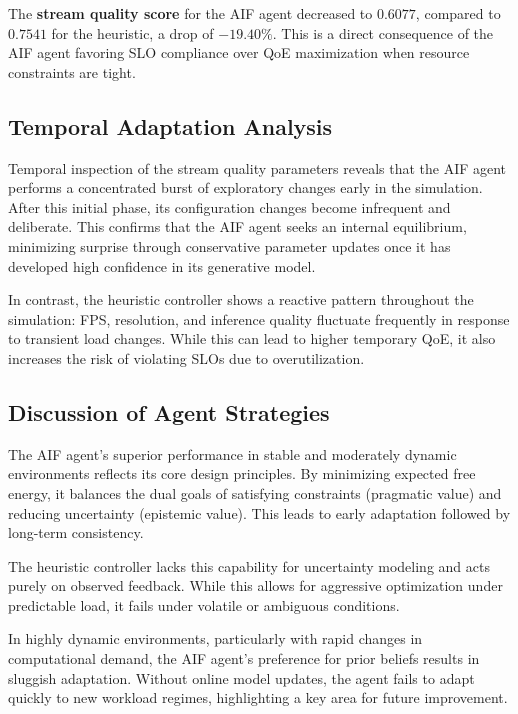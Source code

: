 The \textbf{stream quality score} for the AIF agent decreased to \(0.6077\), compared to \(0.7541\) for the heuristic, a drop of \(-19.40\%\). This is a direct consequence of the AIF agent favoring SLO compliance over QoE maximization when resource constraints are tight.

\subsection{Temporal Adaptation Analysis}

Temporal inspection of the stream quality parameters reveals that the AIF agent performs a concentrated burst of exploratory changes early in the simulation. After this initial phase, its configuration changes become infrequent and deliberate. This confirms that the AIF agent seeks an internal equilibrium, minimizing surprise through conservative parameter updates once it has developed high confidence in its generative model.

In contrast, the heuristic controller shows a reactive pattern throughout the simulation: FPS, resolution, and inference quality fluctuate frequently in response to transient load changes. While this can lead to higher temporary QoE, it also increases the risk of violating SLOs due to overutilization.

\subsection{Discussion of Agent Strategies}

The AIF agent’s superior performance in stable and moderately dynamic environments reflects its core design principles. By minimizing expected free energy, it balances the dual goals of satisfying constraints (pragmatic value) and reducing uncertainty (epistemic value). This leads to early adaptation followed by long-term consistency.

The heuristic controller lacks this capability for uncertainty modeling and acts purely on observed feedback. While this allows for aggressive optimization under predictable load, it fails under volatile or ambiguous conditions.

In highly dynamic environments, particularly with rapid changes in computational demand, the AIF agent’s preference for prior beliefs results in sluggish adaptation. Without online model updates, the agent fails to adapt quickly to new workload regimes, highlighting a key area for future improvement.
